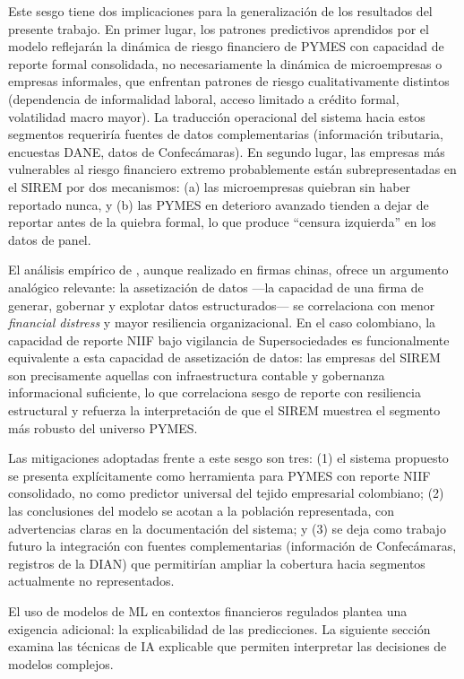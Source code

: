 \documentclass[12pt, letterpaper]{article}
\begin{document}
Este sesgo tiene dos implicaciones para la generalizaci\'on de los resultados del presente trabajo. En primer lugar, los patrones predictivos aprendidos por el modelo reflejar\'an la din\'amica de riesgo financiero de PYMES con capacidad de reporte formal consolidada, no necesariamente la din\'amica de microempresas o empresas informales, que enfrentan patrones de riesgo cualitativamente distintos (dependencia de informalidad laboral, acceso limitado a cr\'edito formal, volatilidad macro mayor). La traducci\'on operacional del sistema hacia estos segmentos requerir\'ia fuentes de datos complementarias (informaci\'on tributaria, encuestas DANE, datos de Confec\'amaras). En segundo lugar, las empresas m\'as vulnerables al riesgo financiero extremo probablemente est\'an subrepresentadas en el SIREM por dos mecanismos: (a) las microempresas quiebran sin haber reportado nunca, y (b) las PYMES en deterioro avanzado tienden a dejar de reportar antes de la quiebra formal, lo que produce ``censura izquierda'' en los datos de panel.

El an\'alisis emp\'irico de \citet{ZhangZhang2026}, aunque realizado en firmas chinas, ofrece un argumento anal\'ogico relevante: la assetizaci\'on de datos ---la capacidad de una firma de generar, gobernar y explotar datos estructurados--- se correlaciona con menor \textit{financial distress} y mayor resiliencia organizacional. En el caso colombiano, la capacidad de reporte NIIF bajo vigilancia de Supersociedades es funcionalmente equivalente a esta capacidad de assetizaci\'on de datos: las empresas del SIREM son precisamente aquellas con infraestructura contable y gobernanza informacional suficiente, lo que correlaciona sesgo de reporte con resiliencia estructural y refuerza la interpretaci\'on de que el SIREM muestrea el segmento m\'as robusto del universo PYMES.

Las mitigaciones adoptadas frente a este sesgo son tres: (1) el sistema propuesto se presenta expl\'icitamente como herramienta para PYMES con reporte NIIF consolidado, no como predictor universal del tejido empresarial colombiano; (2) las conclusiones del modelo se acotan a la poblaci\'on representada, con advertencias claras en la documentaci\'on del sistema; y (3) se deja como trabajo futuro la integraci\'on con fuentes complementarias (informaci\'on de Confec\'amaras, registros de la DIAN) que permitir\'ian ampliar la cobertura hacia segmentos actualmente no representados.

El uso de modelos de ML en contextos financieros regulados plantea una exigencia adicional: la explicabilidad de las predicciones. La siguiente secci\'on examina las t\'ecnicas de IA explicable que permiten interpretar las decisiones de modelos complejos.
\end{document}
